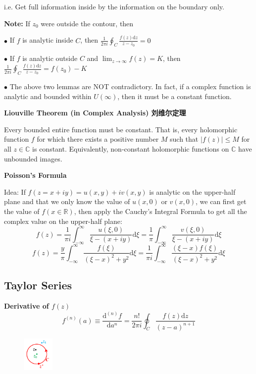 \documentclass[10pt]{article}
\newcommand{\R}{\mathbb R}
\newcommand{\dd}{\mathrm{d}}
\begin{document}
i.e. Get full information inside by the information on the boundary only.

\textbf{Note:} If $z_0$ were outside the contour, then

$\bullet$ If $f$ is analytic inside $C$, then $\frac{1}{2\pi i} \oint_C \frac{f(z)\dd z}{z-z_0} = 0$

$\bullet$ If $f$ is analytic outside $C$ and $\lim_{z\to\infty} f(z) = K$, then $\frac{1}{2\pi i} \oint_C \frac{f(z)\dd z}{z-z_0} = f(z_0) - K$

$\bullet$ The above two lemmas are NOT contradictory. In fact, if a complex function is analytic and bounded within $U(\infty)$, then it must be a constant function.

\textbf{Liouville Theorem (in Complex Analysis) 刘维尔定理}

Every bounded entire function must be constant. That is, every holomorphic function $f$ for which there exists a positive number $M$ such that $|f(z)|\leq M$ for all $z\in\mathbb{C}$ is constant. Equivalently, non-constant holomorphic functions on $\mathbb{C}$ have unbounded images.

\textbf{Poisson's Formula}

Idea: If $f(z=x+iy) = u(x, y) + iv(x, y)$ is analytic on the upper-half plane and that we only know the value of $u(x, 0)$ or $v(x, 0)$, we can first get the value of $f(x\in\R)$, then apply the Cauchy's Integral Formula to get all the complex value on the upper-half plane:
$$
f(z) = \frac{1}{\pi i} \int_{-\infty}^{\infty} \frac{u(\xi,0)}{\xi-(x+iy)} \dd \xi = \frac{1}{\pi} \int_{-\infty}^{\infty} \frac{v(\xi,0)}{\xi-(x+iy)} \dd \xi
$$
$$
f(z) = \frac{y}{\pi} \int_{-\infty}^{\infty} \frac{f(\xi)}{(\xi-x)^2+y^2} \dd \xi = \frac{1}{\pi i} \int_{-\infty}^{\infty} \frac{(\xi-x)f(\xi)}{(\xi-x)^2+y^2} \dd \xi
$$

\subsection{Taylor Series}

\textbf{Derivative of $f(z)$}
$$
f^{(n)}(a) \equiv \frac{\dd^{(n)}f}{\dd a^n} = \frac{n!}{2\pi i} \oint_C \frac{f(z) \dd z}{(z-a)^{n+1}}
$$
\begin{figure}
	\centering
	\includegraphics[width=0.14\textwidth]{img3-1}
\end{figure}
\end{document}
